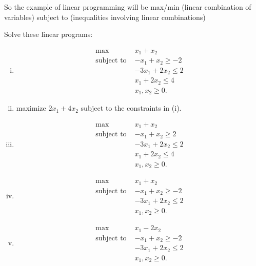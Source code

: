 So the example of linear programming will be max/min (linear combination of variables) subject to (inequalities involving linear combinations)

\begin{eg}
    Solve these linear programs:
    \begin{enumerate}[(i)]
        \item 
        \[
            \begin{aligned}
                \max~ &  x_1 + x_2 \\
                  \text{subject to }   & -x_1 + x_2 \ge -2  \\
                    & -3 x_1 + 2 x_2 \le 2 \\
                    &x_1 + 2 x_2 \le 4 \\
                    &x_1, x_2 \ge 0.
            \end{aligned}
        \]
        \item maximize \(2 x_1 + 4 x_2\) subject to the constraints in (i).
        \item 
        \[
            \begin{aligned}
                \max~ & x_1 + x_2  \\
                   \text{subject to }  & -x_1 + x_2 \ge 2  \\
                    & -3 x_1 + 2 x_2 \le 2 \\
                    & x_1 + 2 x_2 \le 4 \\
                    & x_1, x_2 \ge 0.
            \end{aligned}
        \]
        \item 
        \[
            \begin{aligned}
                \max~ & x_1 + x_2  \\
                  \text{subject to } & -x_1 + x_2 \ge -2  \\
                    & -3 x_1 + 2 x_2 \le 2 \\
                    & x_1, x_2 \ge 0.
            \end{aligned}
        \]
        \item
        \[
            \begin{aligned}
                \max~ & x_1 - 2 x_2  \\
                    \text{subject to } & -x_1 + x_2 \ge -2  \\
                    & -3 x_1 + 2 x_2 \le 2 \\
                    & x_1, x_2 \ge 0.
            \end{aligned}
        \]


    \end{enumerate}
\end{eg}
